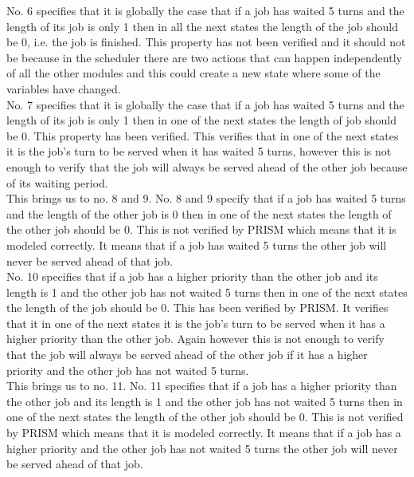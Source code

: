 \documentclass[12pt]{report}
\begin{document}
No. 6 specifies that it is globally the case that if a job has waited 5 turns and the length of its job is only 1 then in all the next states the length of the job should be 0, i.e. the job is finished. This property has not been verified and it should not be because in the scheduler there are two actions that can happen independently of all the other modules and this could create a new state where some of the variables have changed.\\
No. 7 specifies that it is globally the case that if a job has waited 5 turns and the length of its job is only 1 then in one of the next states the length of job should be 0. This property has been verified. This verifies that in one of the next states it is the job's turn to be served when it has waited 5 turns, however this is not enough to verify that the job will always be served ahead of the other job because of its waiting period.\\
This brings us to no. 8 and 9. No. 8 and 9 specify that if a job has waited 5 turns and the length of the other job is 0 then in one of the next states the length of the other job should be 0. This is not verified by PRISM which means that it is modeled correctly. It means that if a job has waited 5 turns the other job will never be served ahead of that job.\\
No. 10 specifies that if a job has a higher priority than the other job and its length is 1 and the other job has not waited 5 turns then in one of the next states the length of the job should be 0. This has been verified by PRISM. It verifies that it in one of the next states it is the job's turn to be served when it has a higher priority than the other job. Again however this is not enough to verify that the job will always be served ahead of the other job if it has a higher priority and the other job has not waited 5 turns. \\
This brings us to no. 11. No. 11 specifies that if a job has a higher priority than the other job and its length is 1 and the other job has not waited 5 turns then in one of the next states the length of the other job should be 0. This is not verified by PRISM which means that it is modeled correctly. It means that if a job has a higher priority and the other job has not waited 5 turns the other job will never be served ahead of that job.
\end{document}
